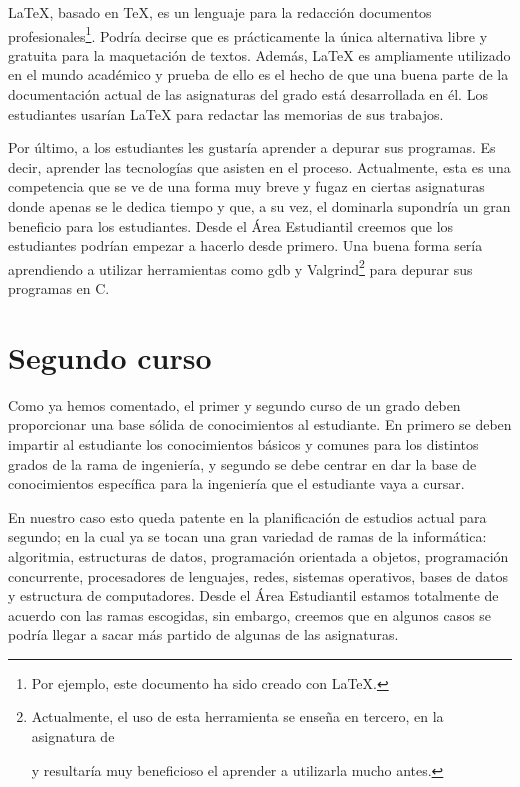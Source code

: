 \LaTeX, basado en \TeX, es un lenguaje para
la redacción documentos profesionales\footnote{
    Por ejemplo, este documento ha sido creado con \LaTeX.
}.
Podría decirse que es prácticamente la única alternativa
libre y gratuita para la maquetación de textos.
Además, \LaTeX{} es ampliamente utilizado en el mundo académico y prueba de
ello es el hecho de que una buena parte de la documentación actual de las
 asignaturas del grado está desarrollada en él.
Los estudiantes usarían \LaTeX{} para redactar las memorias de sus trabajos.

Por último, a los estudiantes les gustaría aprender a depurar sus programas.
Es decir, aprender las tecnologías que asisten en el proceso.
Actualmente, esta es una competencia que se ve de una forma muy breve y fugaz
en ciertas asignaturas donde apenas se le dedica tiempo y que, a su vez, el
dominarla supondría un gran beneficio para los estudiantes.
Desde el Área Estudiantil creemos que los estudiantes podrían empezar a
hacerlo desde primero.
Una buena forma sería
aprendiendo a utilizar herramientas como gdb y Valgrind\footnote{Actualmente,
 el uso de esta herramienta se enseña en tercero, en la asignatura de
 \subject{Ampliación de Sistemas Operativos} y resultaría muy beneficioso el
 aprender a utilizarla mucho antes.} para depurar sus programas en C.

\section{Segundo curso}

Como ya hemos comentado,
el primer y segundo curso de un grado deben proporcionar
una base sólida de conocimientos al estudiante.
En primero se deben impartir al estudiante
los conocimientos básicos y comunes para
los distintos grados de la rama de ingeniería,
y segundo se debe centrar en dar la base de conocimientos específica
para la ingeniería que el estudiante vaya a cursar.

En nuestro caso esto queda patente en
la planificación de estudios actual para segundo;
en la cual ya se tocan una gran variedad de ramas de la informática:
algoritmia, estructuras de datos, programación orientada a objetos,
programación concurrente, procesadores de lenguajes, redes, sistemas operativos,
bases de datos y estructura de computadores.
Desde el Área Estudiantil estamos totalmente de acuerdo con las ramas escogidas,
sin embargo, creemos que en algunos casos
se podría llegar a sacar más partido de algunas de las asignaturas.

